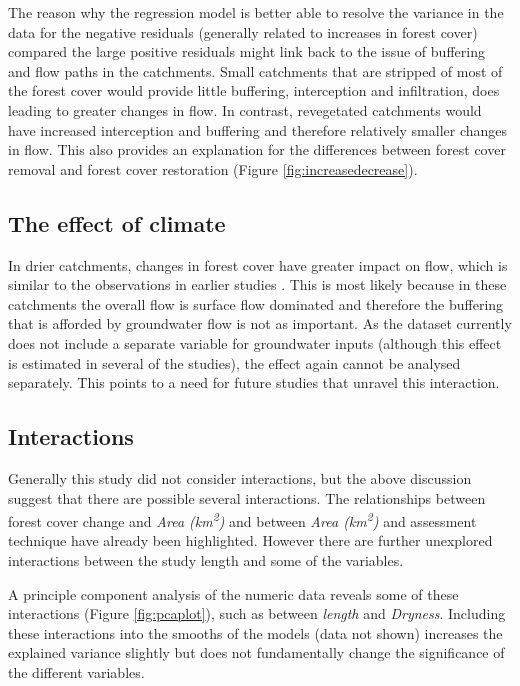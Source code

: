\documentclass[]{elsarticle} %
\begin{document}
The reason why the regression model is better able to resolve the variance in the data for the negative residuals (generally related to increases in forest cover) compared the large positive residuals might link back to the issue of buffering and flow paths in the catchments. Small catchments that are stripped of most of the forest cover would provide little buffering, interception and infiltration, does leading to greater changes in flow. In contrast, revegetated catchments would have increased interception and buffering and therefore relatively smaller changes in flow. This also provides an explanation for the differences between forest cover removal and forest cover restoration (Figure \ref{fig:increasedecrease}).

\hypertarget{the-effect-of-climate}{%
\subsection{The effect of climate}\label{the-effect-of-climate}}

In drier catchments, changes in forest cover have greater impact on flow, which is similar to the observations in earlier studies \citep{zhang2017, zhou2015, filoso2017}. This is most likely because in these catchments the overall flow is surface flow dominated and therefore the buffering that is afforded by groundwater flow is not as important. As the dataset currently does not include a separate variable for groundwater inputs (although this effect is estimated in several of the studies), the effect again cannot be analysed separately. This points to a need for future studies that unravel this interaction.

\hypertarget{interactions}{%
\subsection{Interactions}\label{interactions}}

Generally this study did not consider interactions, but the above discussion suggest that there are possible several interactions. The relationships between forest cover change and \emph{Area (km\textsuperscript{2})} and between \emph{Area (km\textsuperscript{2})} and assessment technique have already been highlighted. However there are further unexplored interactions between the study length and some of the variables.

A principle component analysis of the numeric data reveals some of these interactions (Figure \ref{fig:pcaplot}), such as between \emph{length} and \emph{Dryness}. Including these interactions into the smooths of the models (data not shown) increases the explained variance slightly but does not fundamentally change the significance of the different variables.
\end{document}

